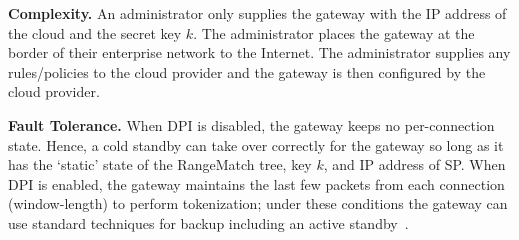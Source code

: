 {\noindent\textbf{Complexity.}
An administrator only supplies the gateway with the IP address of the cloud and the secret key $k$.
The administrator places the gateway at the border of their enterprise network to the Internet.
The administrator supplies any rules/policies to the cloud provider and the gateway is then configured by the cloud provider.

\noindent\textbf{Fault Tolerance.}
When DPI is disabled, the gateway keeps no per-connection state. Hence, a cold standby can take over correctly for the gateway so long as it has the `static' state of the RangeMatch tree, key $k$, and IP address of SP.
When DPI is enabled, the gateway maintains the last few packets from each connection (window-length) to perform tokenization; under these conditions the gateway can use standard techniques for backup including an active standby~\cite{colo}.
}

